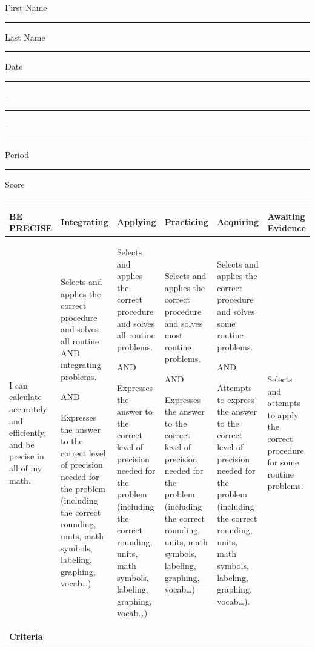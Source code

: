 \documentclass[10pt]{article}
\title{}
\date{}
\begin{document}
\noindent
{\large
First Name \rule{6em}{.1pt}Last Name \rule{6em}{.1pt} Date \rule{1.5em}{.1pt} -- \rule{1.5em}{.1pt} -- \rule{1.5em}{.1pt} Period \rule{2em}{.1pt} Score \rule{2em}{.1pt}
}
\vspace{1em}

\begingroup
\renewcommand{\arraystretch}{1.5}
\begin{center}
\tiny
{
\begin{tabularx}{\textwidth}{|X|X|X|X|X|X|}
\hline
\bf BE PRECISE & \centerline{Integrating} & \centerline{Applying} & \centerline{Practicing} & \centerline{Acquiring} & \centerline{Awaiting Evidence} \\
\hline
I can calculate accurately and efficiently, and be precise in all of my math.&
Selects and applies the correct procedure and solves all routine AND integrating problems.

AND

Expresses the answer to the correct level of precision needed for the problem (including the correct rounding, units, math symbols, labeling, graphing, vocab…)
&Selects and applies the correct procedure and solves all routine problems.


AND

Expresses the answer to the correct level of precision needed for the problem (including the correct rounding, units, math symbols, labeling, graphing, vocab…)
&Selects and applies the correct procedure and solves most routine problems.


AND

Expresses the answer to the correct level of precision needed for the problem (including the correct rounding, units, math symbols, labeling, graphing, vocab…)
&Selects and applies the correct procedure and solves some routine problems.


AND

Attempts to express the answer to the correct level of precision needed for the problem (including the correct rounding, units, math symbols, labeling, graphing, vocab…).
&Selects and attempts to apply the correct procedure for some routine problems.\\
\hline
\bf Criteria&\multicolumn{5}{l|}{\parbox[c][4em]{.8\textwidth}{}}\\
\hline
\end{tabularx}
}
\end{center}
\end{document}
